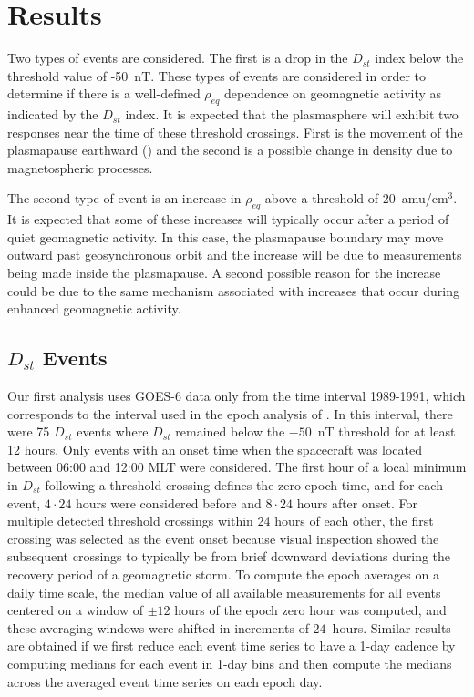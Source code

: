 \documentclass[draft,linenumbers]{agujournal}
\begin{document}
\section{Results}

Two types of events are considered. The first is a drop in the $D_{st}$ index below the threshold value of -50~nT. These types of events are considered in order to determine if there is a well-defined $\rho_{eq}$ dependence on geomagnetic activity as indicated by the $D_{st}$ index.  It is expected that the plasmasphere will exhibit two responses near the time of these threshold crossings.  First is the movement of the plasmapause earthward (\citet{LemaireEarthsPlasmasphere}) and the second is a possible change in density due to magnetospheric processes. 

The second type of event is an increase in $\rho_{eq}$ above a threshold of 20~amu/cm$^3$.  It is expected that some of these increases will typically occur after a period of quiet geomagnetic activity.  In this case, the plasmapause boundary may move outward past geosynchronous orbit and the increase will be due to measurements being made inside the plasmapause.  A second possible reason for the increase could be due to the same mechanism associated with increases that occur during enhanced geomagnetic activity.

\subsection{$D_{st}$ Events}

Our first analysis uses GOES-6 data only from the time interval 1989-1991, which corresponds to the interval used in the epoch analysis of \citet{Takahashi2010}. In this interval, there were 75 $D_{st}$ events where $D_{st}$ remained below the $-50$~nT threshold for at least 12 hours. Only events with an onset time when the spacecraft was located between 06:00 and 12:00 MLT were considered. The first hour of a local minimum in $D_{st}$ following a threshold crossing defines the zero epoch time, and for each event, $4\cdot24$ hours were considered before and $8\cdot24$ hours after onset. For multiple detected threshold crossings within 24 hours of each other, the first crossing was selected as the event onset because visual inspection showed the subsequent crossings to typically be from brief downward deviations during the recovery period of a geomagnetic storm. To compute the epoch averages on a daily time scale, the median value of all available measurements for all events centered on a window of $\pm 12$ hours of the epoch zero hour was computed, and these averaging windows were shifted in increments of $24$~hours. Similar results are obtained if we first reduce each event time series to have a 1-day cadence by computing medians for each event in 1-day bins and then compute the medians across the averaged event time series on each epoch day. 
\end{document}
